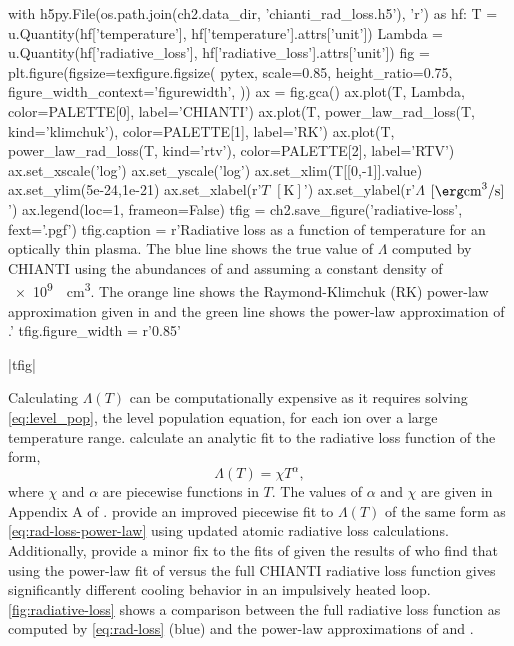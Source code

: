 \begin{pycode}[chapter2]
with h5py.File(os.path.join(ch2.data_dir, 'chianti_rad_loss.h5'), 'r') as hf:
    T = u.Quantity(hf['temperature'], hf['temperature'].attrs['unit'])
    Lambda = u.Quantity(hf['radiative_loss'], hf['radiative_loss'].attrs['unit'])
fig = plt.figure(figsize=texfigure.figsize(
    pytex,
    scale=0.85,
    height_ratio=0.75,
    figure_width_context='figurewidth',
))
ax = fig.gca()
ax.plot(T, Lambda, color=PALETTE[0], label='CHIANTI')
ax.plot(T, power_law_rad_loss(T, kind='klimchuk'), color=PALETTE[1], label='RK')
ax.plot(T, power_law_rad_loss(T, kind='rtv'), color=PALETTE[2], label='RTV')
ax.set_xscale('log')
ax.set_yscale('log')
ax.set_xlim(T[[0,-1]].value)
ax.set_ylim(5e-24,1e-21)
ax.set_xlabel(r'$T$ $[\si{\kelvin}]$')
ax.set_ylabel(r'$\Lambda$ $[\si{\erg\cubic\cm\per\second}]$')
ax.legend(loc=1, frameon=False)
tfig = ch2.save_figure('radiative-loss', fext='.pgf')
tfig.caption = r'Radiative loss as a function of temperature for an optically thin plasma. The blue line shows the true value of $\Lambda$ computed by CHIANTI using the abundances of \citet{feldman_potential_1992} and assuming a constant density of \SI{e9}{\per\cubic\cm}. The orange line shows the Raymond-Klimchuk (RK) power-law approximation given in \citet{klimchuk_highly_2008} and the green line shows the power-law approximation of \citet[RTV]{rosner_dynamics_1978}.'
tfig.figure_width = r'0.85\textwidth'
\end{pycode}
\py[chapter2]|tfig|

Calculating $\Lambda(T)$ can be computationally expensive as it requires solving \autoref{eq:level_pop}, the level population equation, for each ion over a large temperature range. \citet{rosner_dynamics_1978} calculate an analytic fit to the radiative loss function of the form,
\begin{equation}\label{eq:rad-loss-power-law}
    \Lambda(T) = \chi T^\alpha,
\end{equation}
where $\chi$ and $\alpha$ are piecewise functions in $T$. The values of $\alpha$ and $\chi$ are given in Appendix A of \citet{rosner_dynamics_1978}. \citet{klimchuk_highly_2008} provide an improved piecewise fit to $\Lambda(T)$ of the same form as \autoref{eq:rad-loss-power-law} using updated atomic radiative loss calculations. Additionally, \citet{cargill_active_2014} provide a minor fix to the fits of \citet{klimchuk_highly_2008} given the results of \citet{reale_role_2012} who find that using the power-law fit of \citet{rosner_dynamics_1978} versus the full CHIANTI radiative loss function gives significantly different cooling behavior in an impulsively heated loop. \autoref{fig:radiative-loss} shows a comparison between the full radiative loss function as computed by \autoref{eq:rad-loss} (blue) and the power-law approximations of \citet[orange]{klimchuk_highly_2008} and \citet[green]{rosner_dynamics_1978}. 

